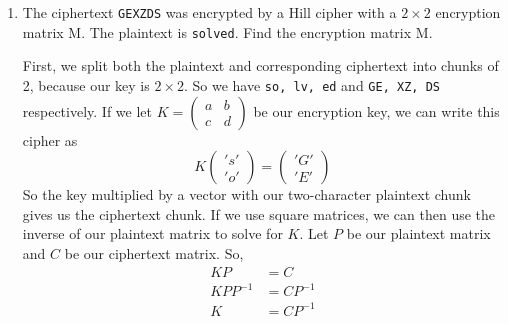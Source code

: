 \documentclass[10pt,letterpaper]{report}
\begin{document}
\begin{enumerate}
	\item The ciphertext \verb|GEXZDS| was encrypted by a Hill cipher with a $2 \times 2$ 		encryption matrix M. The plaintext is \verb|solved|. 
	Find the encryption matrix M.
	\par
	First, we split both the plaintext and corresponding ciphertext into chunks of 2,
	because our key is $2 \times 2$. So we have \verb|so, lv, ed| and \verb|GE, XZ, DS|
	respectively. If we let $K = \begin{pmatrix}
	a & b \\ c & d
	\end{pmatrix}$ be our encryption key, we can write this cipher as
	$$	
	K	
	\begin{pmatrix}
	's' \\ 'o'
	\end{pmatrix} = 
	\begin{pmatrix}
	'G' \\ 'E'
	\end{pmatrix}
	$$
	So the key multiplied by a vector with our two-character plaintext chunk gives us the
	ciphertext chunk. If we use square matrices, we can then use the inverse of our
	plaintext matrix to solve for $K$. Let $P$ be our plaintext matrix and $C$ be our
	ciphertext matrix. So,
	\begin{align*}
	KP &= C \\
	KPP^{-1} &= CP^{-1} \\
	K &= CP^{-1}
	\end{align*}


\end{enumerate}
\end{document}
